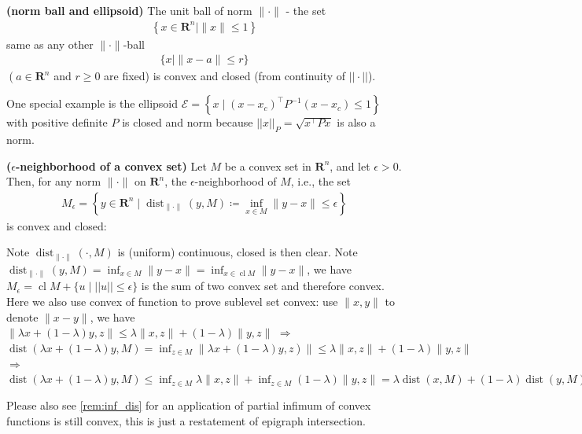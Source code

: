 \documentclass{article}
\newcommand{\bfs}[1]{\textbf{({#1}) }}
\newcommand{\cl}{\operatorname{cl}}
\begin{document}
\begin{exma}{\bfs{norm ball and ellipsoid}}\label{exm:ball_ell}
The unit ball of norm $\|\cdot\|$ - the set
\begin{align*}
\left\{x \in \mathbf{R}^{n} \mid\|x\| \leq 1\right\}
\end{align*}
same as any other $\|\cdot\|$-ball
\begin{align*}
\{x \mid\|x-a\| \leq r\}
\end{align*}
$\left(a \in \mathbf{R}^{n}\right.$ and $r \geq 0$ are fixed) is convex and closed (from continuity of $||\cdot||$).

One special example is the ellipsoid $\mathcal{E}=\left\{x \mid\left(x-x_{c}\right)^{\top} P^{-1}\left(x-x_{c}\right) \leq 1\right\}$ with positive definite $P$ is closed and norm because $||x||_P = \sqrt{x^{\top}Px}$ is also a norm.
\end{exma}
\begin{exma}{\bfs{$\epsilon$-neighborhood of a convex set}}\label{rem:dis_con_1}
Let $M$ be a convex set in $\mathbf{R}^{n}$, and let $\epsilon>0$. Then, for any norm $\|\cdot\|$ on $\mathbf{R}^{n}$, the $\epsilon$-neighborhood of $M$, i.e., the set
\begin{align*}
M_{\epsilon}=\left\{y \in \mathbf{R}^{n} \mid \operatorname{dist}_{\|\cdot\|}(y, M) \coloneqq \inf _{x \in M}\|y-x\| \leq \epsilon\right\}
\end{align*}
is convex and closed:

Note $\operatorname{dist}_{\|\cdot\|}(\cdot, M)$ is (uniform) continuous, closed is then clear. Note $ \operatorname{dist}_{\|\cdot\|}(y, M) = \inf _{x \in M}\|y-x\| = \inf _{x \in \cl M}\|y-x\| $, we have $M_{\epsilon} = \cl M + \{u\mid ||u||\le \epsilon\}$ is the sum of two convex set and therefore convex. Here we also use convex of function to prove sublevel set convex: use $\|x,y\| $ to denote $\|x-y\|$, we have $\| \lambda x+(1-\lambda) y, z\|\leq \lambda\| x, z\|+(1-\lambda)\| y, z \|$ $\Rightarrow$
$\left.\operatorname{dist}(\lambda x+(1-\lambda) y, M)=\inf _{z \in M} \| \lambda x+(1-\lambda) y, z\right)\|\leq \lambda\| x, z\|+(1-\lambda)\| y, z \|$ $\Rightarrow$
$\operatorname{dist}(\lambda x+(1-\lambda) y, M) \leq \inf _{z \in M} \lambda\|x, z\|+\inf _{z \in M}(1-\lambda)\|y, z\|=\lambda \operatorname{dist}(x, M)+(1-\lambda) \operatorname{dist}(y, M)$
\end{exma}
\begin{rema}
Please also see \cref{rem:inf_dis} for an application of partial infimum of convex functions is still convex, this is just a restatement of epigraph intersection.
\end{rema}
\end{document}

